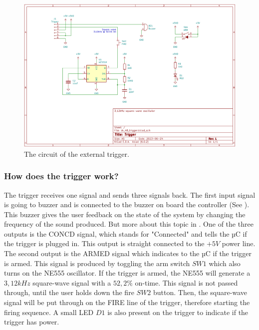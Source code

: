 \begin{figure}[!ht]
    \centering
    \includegraphics[width=15cm]{./Figures/trigger_circuit.png}
    \caption{The circuit of the external trigger.}
    \label{fig:trigger_circuit}     
\end{figure}

\pagebreak

\subsubsection{How does the trigger work?}
The trigger receives one signal and sends three signals back. The first input signal is going to buzzer and is connected to the buzzer on board the controller (See ). This buzzer gives the user feedback on the state of the system by changing the frequency of the sound produced. But more about this topic in . One of the three outputs is the CONCD signal, which stands for "Connected" and tells the µC if the trigger is plugged in. This output is straight connected to the $+5V$ power line. The second output is the ARMED signal which indicates to the µC if the trigger is armed. This signal is produced by toggling the arm switch $SW1$ which also turns on the NE555 oscillator. If the trigger is armed, the NE555 will generate a $3,12kHz$ square-wave signal with a $52,2\%$ on-time. This signal is not passed through, until the user holds down the fire $SW2$ button. Then, the square-wave signal will be put through on the FIRE line of the trigger, therefore starting the firing sequence. A small LED $D1$ is also present on the trigger to indicate if the trigger has power.


